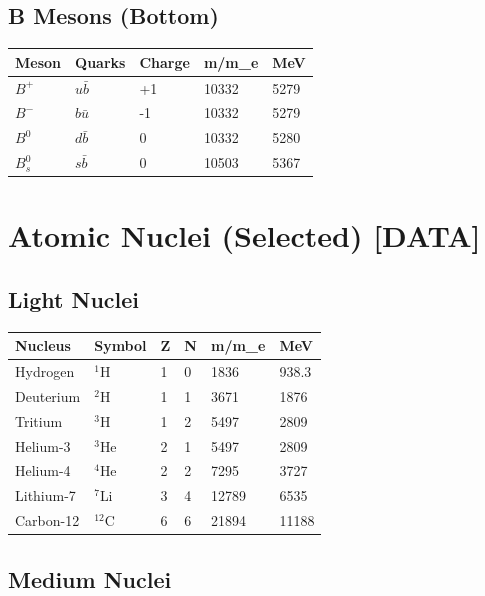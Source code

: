 \documentclass[
  11pt,
  letterpaper,
  twoside,
  openright]{book}
\begin{document}
\subsection{B Mesons (Bottom)}\label{b-mesons-bottom}

\begin{longtable}[]{@{}lllll@{}}
\toprule\noalign{}
Meson & Quarks & Charge & m/m\_e & MeV \\
\midrule\noalign{}
\endhead
\bottomrule\noalign{}
\endlastfoot
\(B^+\) & \(u\bar{b}\) & +1 & 10332 & 5279 \\
\(B^-\) & \(b\bar{u}\) & -1 & 10332 & 5279 \\
\(B^0\) & \(d\bar{b}\) & 0 & 10332 & 5280 \\
\(B_s^0\) & \(s\bar{b}\) & 0 & 10503 & 5367 \\
\end{longtable}

\section{Atomic Nuclei (Selected)
{[}DATA{]}}\label{atomic-nuclei-selected-data}

\subsection{Light Nuclei}\label{light-nuclei}

\begin{longtable}[]{@{}llllll@{}}
\toprule\noalign{}
Nucleus & Symbol & Z & N & m/m\_e & MeV \\
\midrule\noalign{}
\endhead
\bottomrule\noalign{}
\endlastfoot
Hydrogen & \(^1\)H & 1 & 0 & 1836 & 938.3 \\
Deuterium & \(^2\)H & 1 & 1 & 3671 & 1876 \\
Tritium & \(^3\)H & 1 & 2 & 5497 & 2809 \\
Helium-3 & \(^3\)He & 2 & 1 & 5497 & 2809 \\
Helium-4 & \(^4\)He & 2 & 2 & 7295 & 3727 \\
Lithium-7 & \(^7\)Li & 3 & 4 & 12789 & 6535 \\
Carbon-12 & \(^{12}\)C & 6 & 6 & 21894 & 11188 \\
\end{longtable}

\subsection{Medium Nuclei}\label{medium-nuclei}
\end{document}
